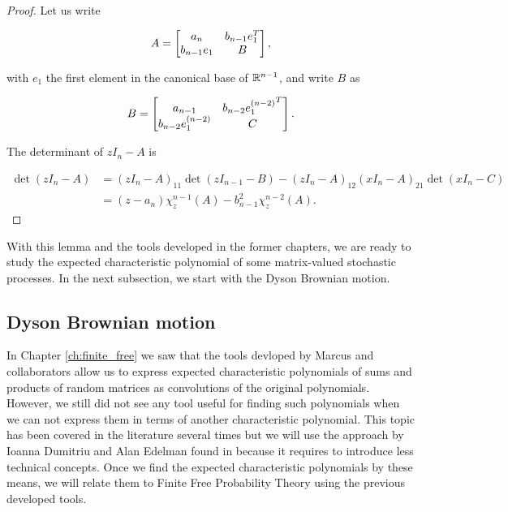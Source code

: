 \begin{proof}
    Let us write

    \begin{equation*}
        A = \begin{bmatrix}
            a_n   & b_{n-1} e_1^T \\
            b_{n-1}e_1 & B 
        \end{bmatrix},
    \end{equation*}

    \noindent with $e_1$ the first element in the canonical base of $\mathbb R^{n-1}$, and write $B$ as

    \begin{equation*}
        B = \begin{bmatrix}
            a_{n-1}   & b_{n-2} {e_1^{(n-2)}}^T \\
            b_{n-2} e_1^{(n-2)} & C 
        \end{bmatrix}.
    \end{equation*}

    The determinant of $zI_n - A$ is 

    \begin{align*}
        \det \left( zI_n - A \right) &= (zI_n - A)_{11}\det(zI_{n-1}-B) - (zI_n - A)_{12}(xI_n - A)_{21}\det(xI_n - C)\\ 
        &= (z - a_n)\chi^{n-1}_z(A) - b_{n-1}^2\chi^{n-2}_z(A).
    \end{align*}
\end{proof}

With this lemma and the tools developed in the former chapters, we are ready to study the expected characteristic polynomial of some matrix-valued stochastic processes. In the next subsection, we start with the Dyson Brownian motion.

\subsection{Dyson Brownian motion}

In Chapter \ref{ch:finite_free}  we saw that the tools devloped by Marcus and collaborators \cite{article:finitefree,article:arizmendi_perales,article:finitefree} allow us to express expected characteristic polynomials of sums and products of random matrices as convolutions of the original polynomials. However, we still did not see any tool useful for finding such polynomials when we can not express them in terms of another characteristic polynomial. This topic has been covered in the literature several times \cite{book:percy_deift_orthogonal,edelman1988eigenvalues,article:aomoto1987jacobi_selberg_integrals} but we will use the approach by Ioanna Dumitriu and Alan Edelman found in \cite{article:dumitriu_edelman} because it requires to introduce less technical concepts. Once we find the expected characteristic polynomials by these means, we will relate them to Finite Free Probability Theory using the previous developed tools.

